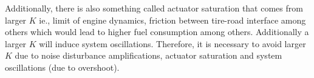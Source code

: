 Additionally, there is also something called actuator saturation that comes from larger $K$ ie., limit of engine dynamics, friction between tire-road interface among others which would lead to higher fuel consumption among others. Additionally a larger $K$ will induce system oscillations. Therefore, it is necessary to avoid larger $K$ due to noise disturbance amplifications, actuator saturation and system oscillations (due to overshoot).








